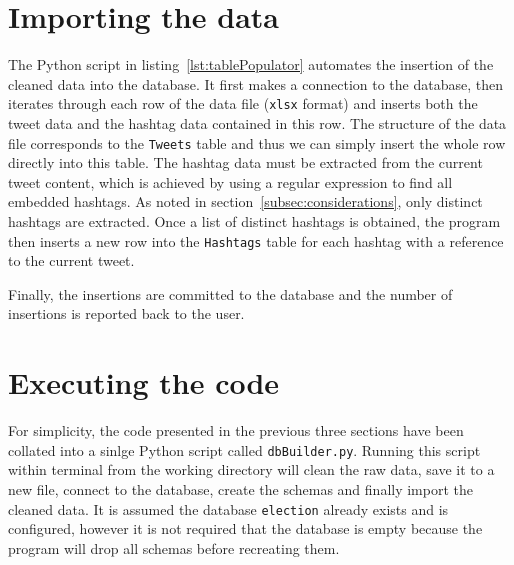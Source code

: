 \documentclass[a4paper, 12pt]{report}
\begin{document}

\label{lst:dataCleaner}

\newpage
\section{Importing the data}
\label{sec:dataImporting}

The Python script in listing~\ref{lst:tablePopulator} automates the insertion of the cleaned data into the database. It first makes a connection to the database, then iterates through each row of the data file (\texttt{xlsx} format) and inserts both the tweet data and the hashtag data contained in this row. The structure of the data file corresponds to the \texttt{Tweets} table and thus we can simply insert the whole row directly into this table. The hashtag data must be extracted from the current tweet content, which is achieved by using a regular expression to find all embedded hashtags. As noted in section~\ref{subsec:considerations}, only distinct hashtags are extracted. Once a list of distinct hashtags is obtained, the program then inserts a new row into the \texttt{Hashtags} table for each hashtag with a reference to the current tweet.

Finally, the insertions are committed to the database and the number of insertions is reported back to the user.


\label{lst:tablePopulator}

\newpage
\section{Executing the code}

For simplicity, the code presented in the previous three sections have been collated into a sinlge Python script called \texttt{dbBuilder.py}. Running this script within terminal from the working directory will clean the raw data, save it to a new file, connect to the database, create the schemas and finally import the cleaned data. It is assumed the database \texttt{election} already exists and is configured, however it is not required that the database is empty because the program will drop all schemas before recreating them.
\end{document}
